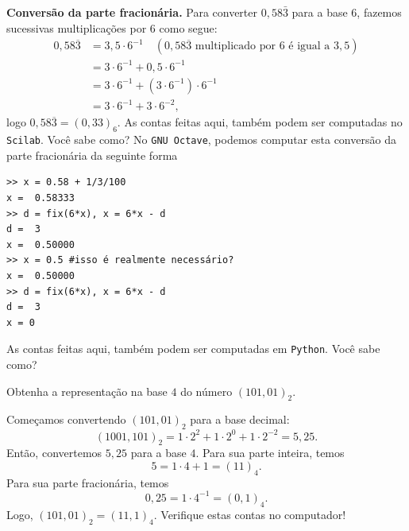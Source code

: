 \begin{resol}
{\bf Conversão da parte fracionária.} Para converter $0,58\bar{3}$ para a base $6$, fazemos sucessivas multiplicações por $6$ como segue:
  \begin{equation*}
    \begin{split}
    0,58\overline{3} &= 3,5\cdot 6^{-1}\quad(\mbox{$0,58\overline{3}$ multiplicado por $6$ é igual a $3,5$})\\
    &= 3\cdot 6^{-1} + 0,5\cdot 6^{-1}\\
    &= 3\cdot 6^{-1} + (3\cdot 6^{-1})\cdot 6^{-1}\\
    &= 3\cdot 6^{-1} + 3\cdot 6^{-2},
    \end{split}
  \end{equation*}
logo $0,58\overline{3} = (0,33)_6$.
\ifisscilab
As contas feitas aqui, também podem ser computadas no \verb+Scilab+. Você sabe como?
\fi
\ifisoctave
No \verb+GNU Octave+, podemos computar esta conversão da parte fracionária da seguinte forma
\begin{verbatim}
>> x = 0.58 + 1/3/100
x =  0.58333
>> d = fix(6*x), x = 6*x - d
d =  3
x =  0.50000
>> x = 0.5 #isso é realmente necessário?
x =  0.50000
>> d = fix(6*x), x = 6*x - d
d =  3
x = 0
\end{verbatim}
\fi
\ifispython
As contas feitas aqui, também podem ser computadas em \verb+Python+. Você sabe como?
\fi
\end{resol}

\begin{exeresol}
  Obtenha a representação na base $4$ do número $(101,01)_2$.
\end{exeresol}
\begin{resol}
  Começamos convertendo $(101,01)_2$ para a base decimal:
  \begin{equation*}
    (1001,101)_2 = 1\cdot 2^2 + 1\cdot 2^0 + 1\cdot 2^{-2} = 5,25.
  \end{equation*}
Então, convertemos $5,25$ para a base $4$. Para sua parte inteira, temos
\begin{equation*}
  5 = 1\cdot 4 + 1 = (11)_4.
\end{equation*}
Para sua parte fracionária, temos
\begin{equation*}
  0,25 = 1\cdot 4^{-1} = (0,1)_4.
\end{equation*}
Logo, $(101,01)_2 = (11,1)_4$. Verifique estas contas no computador!
\end{resol}

